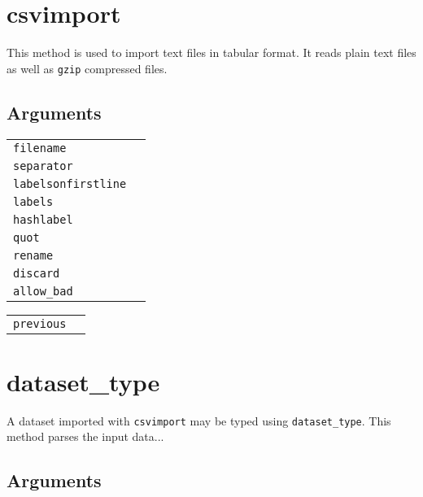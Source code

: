 \section{csvimport}

This method is used to import text files in tabular format.  It reads
plain text files as well as \texttt{gzip} compressed files.

\subsection{Arguments}

\begin{tabular}{ll}
  \texttt{filename} & \\ %
  \texttt{separator} & \\ %
  \texttt{labelsonfirstline} & \\ %
  \texttt{labels} & \\ %
  \texttt{hashlabel} & \\ %
  \texttt{quot} & \\ %
  \texttt{rename} & \\ %
  \texttt{discard} & \\ %
  \texttt{allow\_bad} & \\ %
\end{tabular}

\begin{tabular}{ll}
  \texttt{previous}
\end{tabular}


\clearpage
\section{dataset\_type}

A dataset imported with \texttt{csvimport} may be typed using
\texttt{dataset\_type}.  This method parses the input data...



\subsection{Arguments}

